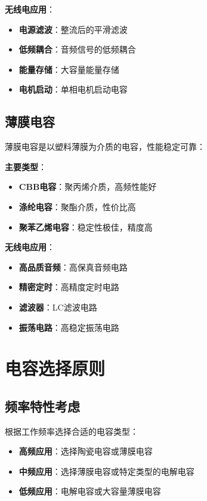 \documentclass[12pt,UTF8]{ctexbook}
\begin{document}
\textbf{无线电应用}：
\begin{itemize}[leftmargin=3.5em]
    \item \textbf{电源滤波}：整流后的平滑滤波
    \item \textbf{低频耦合}：音频信号的低频耦合
    \item \textbf{能量存储}：大容量能量存储
    \item \textbf{电机启动}：单相电机启动电容
\end{itemize}

\subsection{薄膜电容}

薄膜电容是以塑料薄膜为介质的电容，性能稳定可靠：

\textbf{主要类型}：
\begin{itemize}[leftmargin=3.5em]
    \item \textbf{CBB电容}：聚丙烯介质，高频性能好
    \item \textbf{涤纶电容}：聚酯介质，性价比高
    \item \textbf{聚苯乙烯电容}：稳定性极佳，精度高
\end{itemize}

\textbf{无线电应用}：
\begin{itemize}[leftmargin=3.5em]
    \item \textbf{高品质音频}：高保真音频电路
    \item \textbf{精密定时}：高精度定时电路
    \item \textbf{滤波器}：LC滤波电路
    \item \textbf{振荡电路}：高稳定振荡电路
\end{itemize}

\section{电容选择原则}

\subsection{频率特性考虑}

根据工作频率选择合适的电容类型：
\begin{itemize}[leftmargin=3.5em]
    \item \textbf{高频应用}：选择陶瓷电容或薄膜电容
    \item \textbf{中频应用}：选择薄膜电容或特定类型的电解电容
    \item \textbf{低频应用}：电解电容或大容量薄膜电容
\end{itemize}
\end{document}
